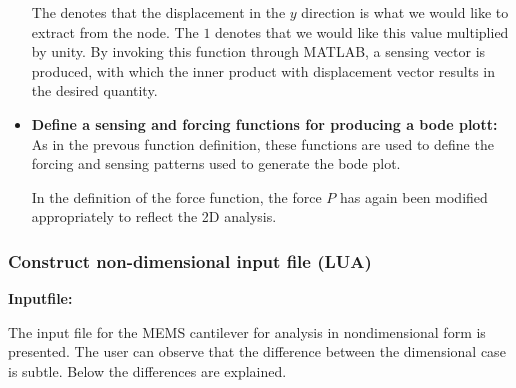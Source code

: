 \begin{itemize}
  The  denotes that the displacement in the $y$ direction 
  is what we would like to extract from the node. The $1$ denotes that
  we would like this value multiplied by unity. By invoking this function
  through MATLAB, a sensing vector is produced, with which the inner 
  product with displacement vector results in the desired quantity. 

  \item{\textbf{Define a sensing and forcing functions for producing 
                                                      a bode plott:}}
  As in the prevous function definition, these functions are used to 
  define the forcing and sensing patterns used to generate the bode plot.

  In the definition of the force function, the force $P$ has again been
  modified appropriately to reflect the 2D analysis.

\end{itemize}


\clearpage
\subsubsection*{Construct non-dimensional input file (LUA)}
\begin{flushleft}
  \textbf{Inputfile:}
  \\
\end{flushleft}
\hspace{1in}
{\footnotesize
{}
}

\clearpage
The input file for the MEMS cantilever for analysis in nondimensional 
form is presented. The user can observe that the difference between the 
dimensional case is subtle. Below the differences are explained.

